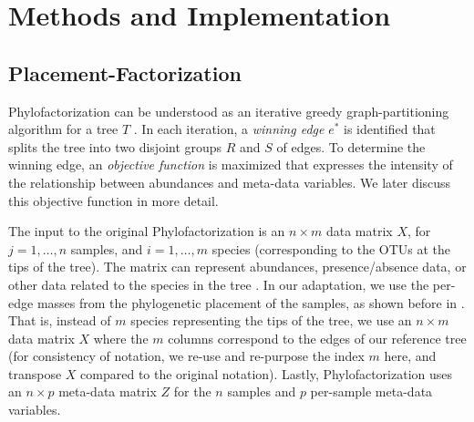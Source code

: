 
\section{Methods and Implementation}
\label{ch:Factorization:sec:Methods}


\subsection{Placement-Factorization}
\label{sec:Factorization:sub:Methods:sub:Phylofactor}

Phylofactorization can be understood as an iterative greedy graph-partitioning algorithm for a tree $T$ \cite{Washburne2018}.
In each iteration, a \emph{winning edge} $e^*$ is identified
that splits the tree into two disjoint groups $R$ and $S$ of edges.
To determine the winning edge, an \emph{objective function} is maximized
that expresses the intensity of the relationship between abundances and meta-data variables.
We later discuss this objective function in more detail.

The input to the original Phylofactorization is an $n \times m$ data matrix $X$,
for $j = 1, \ldots, n$ samples, and $i = 1, \ldots, m$ species (corresponding to the OTUs at the tips of the tree).
The matrix can represent abundances, presence/absence data, or other data related to the species in the tree \cite{Washburne2019}.
In our adaptation, we use the per-edge masses from the phylogenetic placement of the samples,
as shown before in .
That is, instead of $m$ species representing the tips of the tree,
we use an $n \times m$ data matrix $X$ where the $m$ columns correspond to the edges of our reference tree
(for consistency of notation, we re-use and re-purpose the index $m$ here,
and transpose $X$ compared to the original notation).
Lastly, Phylofactorization uses an $n \times p$ meta-data matrix $Z$ for the $n$ samples
and $p$ per-sample meta-data variables.

